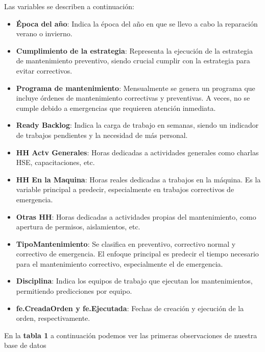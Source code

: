 \documentclass[
  11pt,
  bookmarksnumbered]{article}
\begin{document}
Las variables se describen a continuación:

\begin{itemize}
\item
  \textbf{Época del año}: Indica la época del año en que se llevo a cabo la reparación verano o invierno.
\item
  \textbf{Cumplimiento de la estrategia}: Representa la ejecución de la estrategia de mantenimiento preventivo, siendo crucial cumplir con la estrategia para evitar correctivos.
\item
  \textbf{Programa de mantenimiento}: Mensualmente se genera un programa que incluye órdenes de mantenimiento correctivas y preventivas.
  A veces, no se cumple debido a emergencias que requieren atención inmediata.
\item
  \textbf{Ready Backlog}: Indica la carga de trabajo en semanas, siendo un indicador de trabajos pendientes y la necesidad de más personal.
\item
  \textbf{HH Actv Generales}: Horas dedicadas a actividades generales como charlas HSE, capacitaciones, etc.
\item
  \textbf{HH En la Maquina}: Horas reales dedicadas a trabajos en la máquina.
  Es la variable principal a predecir, especialmente en trabajos correctivos de emergencia.
\item
  \textbf{Otras HH}: Horas dedicadas a actividades propias del mantenimiento, como apertura de permisos, aislamientos, etc.
\item
  \textbf{TipoMantenimiento}: Se clasifica en preventivo, correctivo normal y correctivo de emergencia.
  El enfoque principal es predecir el tiempo necesario para el mantenimiento correctivo, especialmente el de emergencia.
\item
  \textbf{Disciplina}: Indica los equipos de trabajo que ejecutan los mantenimientos, permitiendo predicciones por equipo.
\item
  \textbf{fe.CreadaOrden y fe.Ejecutada}: Fechas de creación y ejecución de la orden, respectivamente.
\end{itemize}

\vspace{0.2cm}

En la \textbf{tabla 1} a continuación podemos ver las primeras observaciones de nuestra base de datos
\end{document}

